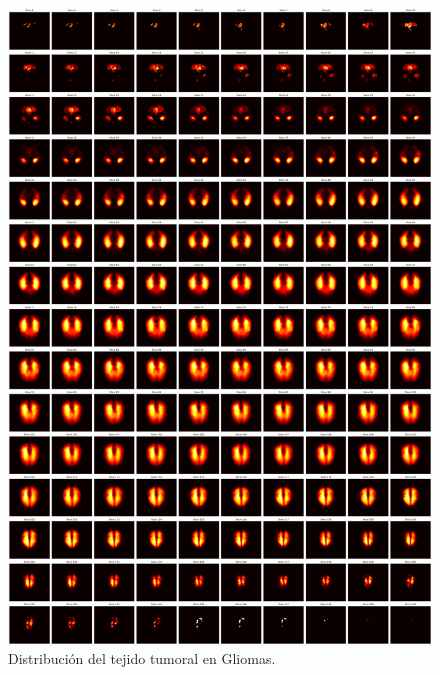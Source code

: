 \begin{figure}[!h]
	\centering
	\includegraphics[width=1.0\linewidth]{imagenes/metodologia_heatmapsGLI.png}
	\caption{Distribución del tejido tumoral en Gliomas.}
\end{figure}

